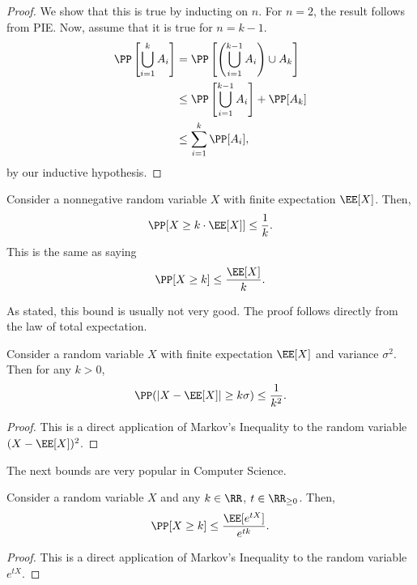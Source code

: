 \begin{proof}
We show that this is true by inducting on $n$. For $n=2$, the result follows from PIE. Now, assume that it is true for $n=k-1$. 
\begin{align*}
    \PP\left[\bigcup_{i=1}^k A_i\right] &= \PP\left[\left(\bigcup_{i=1}^{k-1}A_i\right) \cup A_k\right] \\
    &\leq \PP\left[\bigcup_{i=1}^{k-1}A_i\right] + \PP[A_k] \\
    &\leq \sum_{i=1}^k \PP[A_i],
\end{align*}
by our inductive hypothesis. 
\end{proof}

\begin{theorem}

Consider a nonnegative random variable $X$ with finite expectation $\EE[X]$. Then, 
\[\PP[X\geq k\cdot \EE[X]]\leq \frac{1}{k}.\]
This is the same as saying 
\[\PP[X\geq k] \leq \frac{\EE[X]}{k}.\]
\end{theorem}

As stated, this bound is usually not very good. The proof follows directly from the law of total expectation. 

\begin{theorem}

Consider a random variable $X$ with finite expectation $\EE[X]$ and variance $\sigma^2$. Then for any $k > 0$, 
\[\PP(\vert X - \EE[X]\vert \geq k\sigma) \leq \frac{1}{k^2}.\]
\end{theorem}

\begin{proof}
This is a direct application of Markov's Inequality to the random variable $(X-\EE[X])^2$.
\end{proof}

The next bounds are very popular in Computer Science.

\begin{theorem}

Consider a random variable $X$ and any $k\in \RR$, $t\in \RR_{\geq 0}$. Then, 
\[\PP[X\geq k]\leq \frac{\EE[e^{tX}]}{e^{tk}}.\]
\end{theorem}

\begin{proof}
This is a direct application of Markov's Inequality to the random variable $e^{tX}$. 
\end{proof}

